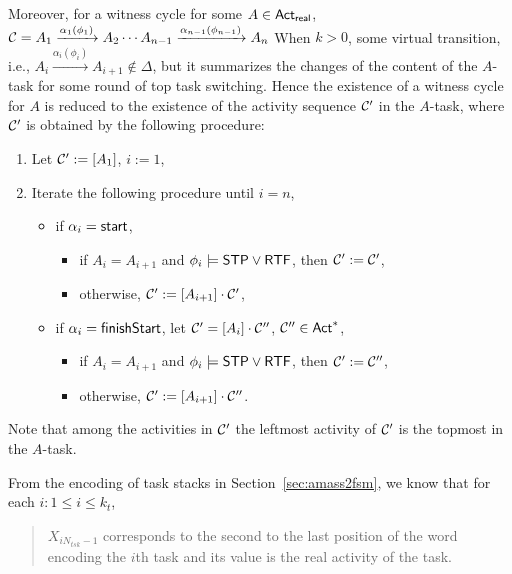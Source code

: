 Moreover, for a witness cycle for some $A\in{\sf Act}_{\sf real}$,
${\mathcal{C} } = A_1 \xrightarrow{\alpha_1(\phi_1)} A_2 \cdots A_{n-1} \xrightarrow{\alpha_{n-1}(\phi_{n-1})} A_n$ 
When $k>0$, some virtual transition, i.e., $A_i\xrightarrow{\alpha_i(\phi_i)} A_{i+1}\notin \Delta$, 
but it summarizes the changes of the content of the $A$-task for some round of top task switching.
Hence the existence of a witness cycle for $A$ is reduced to the existence of the activity sequence ${\mathcal{C} }'$ in the $A$-task, where ${\mathcal{C} }'$ is obtained by the following procedure:
\begin{enumerate}
    \item Let ${\mathcal{C} }' := [A_1]$, $i:= 1$,
    \item Iterate the following procedure until $i = n$,
        \begin{itemize}
            \item if $\alpha_i = {\mathsf{start} }$,
                \begin{itemize}
                    \item if $A_i=A_{i+1}$ and $\phi_i \models{\sf STP}\vee{\sf RTF}$, then ${\mathcal{C} }':={\mathcal{C} }'$,
                    \item otherwise, ${\mathcal{C} }':= [A_{i+1}]\cdot{\mathcal{C} }'$,
                \end{itemize}
            \item if $\alpha_i = {\mathsf{finishStart} }$,
                let ${\mathcal{C} }' = [A_i]\cdot{\mathcal{C} }''$, ${\mathcal{C} }''\in{\sf Act}^*$,
                        \begin{itemize}
                            \item if $A_i=A_{i+1}$ and $\phi_i \models{\sf STP}\vee{\sf RTF}$, 
                                then ${\mathcal{C} }':={\mathcal{C} }''$,
                            \item otherwise, ${\mathcal{C} }':= [A_{i+1}]\cdot{\mathcal{C} }''$.
                        \end{itemize}
        \end{itemize}
\end{enumerate}
Note that among the activities in ${\mathcal{C} }'$ the leftmost activity of ${\mathcal{C} }'$ is the topmost in the $A$-task.

From the encoding of task stacks in Section~\ref{sec:amass2fsm}, we know that for each $i: 1 \le i \le k_t$,
\begin{quote}
$X_{i N_{tsk} - 1}$ corresponds to the second to the last position of the word encoding the $i$th task and its value is the real activity of the task.
\end{quote}

